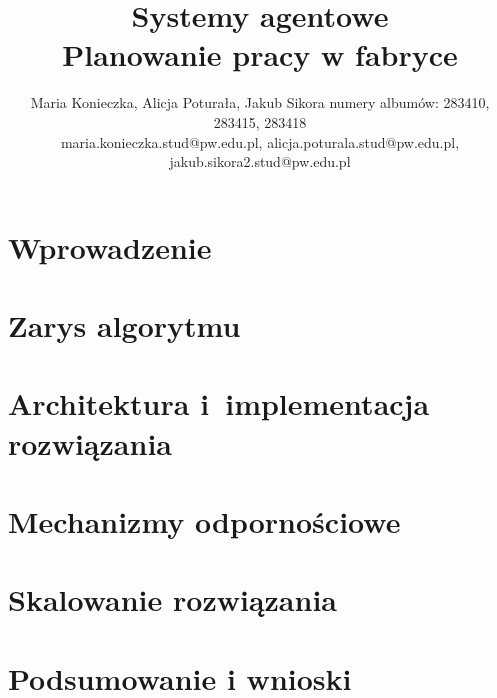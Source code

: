 \documentclass{article}
\title{Systemy agentowe\\ Planowanie pracy w fabryce}
\author{
Maria Konieczka, Alicja Poturała, Jakub Sikora
\affiliations
numery albumów: 283410, 283415, 283418 \\
\emails
maria.konieczka.stud@pw.edu.pl, alicja.poturala.stud@pw.edu.pl, jakub.sikora2.stud@pw.edu.pl
}
\begin{document}
\maketitle

\section{Wprowadzenie}
\label{sec:wprowadzenie}


\section{Zarys algorytmu}
\label{sec:algorytm}


\section{Architektura i~implementacja rozwiązania}
\label{sec:architektura}


\section{Mechanizmy odpornościowe}
\label{sec:recovery}


\section{Skalowanie rozwiązania}
\label{sec:skalowanie}


\section{Podsumowanie i wnioski}
\label{sec:podsumowanie}




\end{document}

